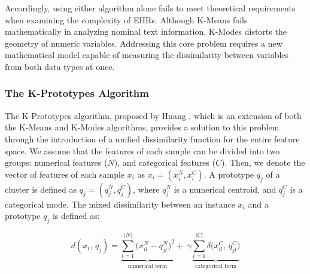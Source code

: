 Accordingly, using either algorithm alone fails to meet theoretical requirements when examining the complexity of EHRs. Although K-Means fails mathematically in analyzing nominal text information, K-Modes distorts the geometry of numeric variables. Addressing this core problem requires a new mathematical model capable of measuring the dissimilarity between variables from both data types at once.

\subsubsection*{The K-Prototypes Algorithm}

The K-Prototypes algorithm, proposed by Huang \cite{huang1998}, which is an extension of both the K-Means and K-Modes algorithms, provides a solution to this problem through the introduction of a unified dissimilarity function for the entire feature space. We assume that the features of each sample can be divided into two groups: numerical features ($N$), and categorical features ($C$). Then, we denote the vector of features of each sample $x_i$ as $x_i = (x_i^N, x_i^C)$. A prototype $q_j$ of a cluster is defined as $q_j = (q_j^N, q_j^C)$, where $q_j^N$ is a numerical centroid, and $q_j^C$ is a categorical mode. The mixed dissimilarity between an instance $x_i$ and a prototype $q_j$ is defined as:

\vspace{1em}

\begin{equation}
    d(x_i,\, q_j) = \underbrace{\sum_{l=1}^{|N|} \bigl(x_{il}^{N} - q_{jl}^{N}\bigr)^2}_{\text{numerical term}} + \;\gamma \underbrace{\sum_{l=1}^{|C|} \delta\bigl(x_{il}^{C},\, q_{jl}^{C}\bigr)}_{\text{categorical term}}
    \label{eq:kproto_dist}
\end{equation}

